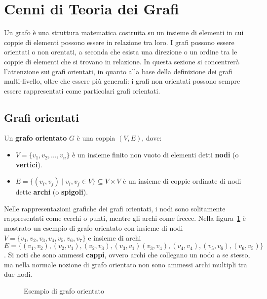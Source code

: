 \section{Cenni di Teoria dei Grafi}\label{sec:cenni-di-teoria-dei-grafi}

Un grafo \`e una struttura matematica costruita su un insieme di elementi in cui coppie di elementi possono essere
in relazione tra loro.
I grafi possono essere orientati o non orentati, a seconda che esista una direzione o un ordine tra le coppie
di elementi che si trovano in relazione.
In questa sezione si concentrerà l'attenzione sui grafi orientati, in quanto alla base della definizione dei
grafi multi-livello, oltre che essere più generali: i grafi non orientati possono sempre essere rappresentati
come particolari grafi orientati.

\subsection{Grafi orientati}\label{subsec:grafi-orientati}

\begin{definition}
    Un \textbf{grafo orientato} $G$ \`e una coppia $(V, E)$, dove:
    \begin{itemize}
        \item $V  = \{v_1, v_2, \ldots, v_n\}$ \`e un insieme finito non vuoto di elementi detti \textbf{nodi}
        (o \textbf{vertici}).
        \item $E = \{(v_i, v_j) \mid v_i, v_j \in V\} \subseteq V \times V$ \`e un insieme di coppie ordinate di
        nodi dette \textbf{archi} (o \textbf{spigoli}).
    \end{itemize}
\end{definition}

Nelle rappresentazioni grafiche dei grafi orientati, i nodi sono solitamente rappresentati
come cerchi o punti, mentre gli archi come frecce.
Nella figura~\ref{fig:directed-graph-example} \`e mostrato un esempio di grafo orientato con insieme di nodi
$V = \{v_1, v_2, v_3, v_4, v_5, v_6, v_7\}$ e insieme di archi $E = \{(v_1, v_2), (v_2, v_1), (v_2, v_3), (v_3, v_1)
(v_3, v_4), (v_4, v_4), (v_5, v_6), (v_6, v_5)\}$. \newline
Si noti che sono ammessi \textbf{cappi}, ovvero archi che collegano un nodo a se stesso, ma nella normale nozione
di grafo orientato non sono ammessi archi multipli tra due nodi.

\begin{figure}[t]
    \centering
    
    \vspace{-10pt}
    \caption{Esempio di grafo orientato}
    \label{fig:directed-graph-example}
\end{figure}

